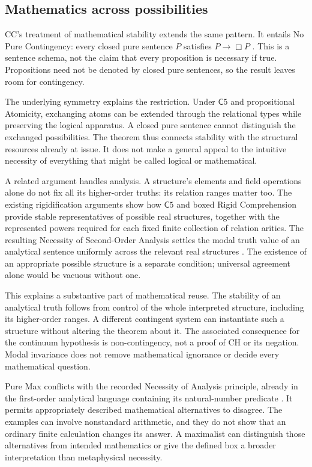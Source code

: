 \documentclass[11pt]{article}
\newcommand{\C}{\mathsf C}
\begin{document}
\subsection{Mathematics across possibilities}

CC's treatment of mathematical stability extends the same pattern. It entails No Pure Contingency: every closed pure sentence $P$ satisfies $P\to\Box P$ \citep{npc}. This is a sentence schema, not the claim that every proposition is necessary if true. Propositions need not be denoted by closed pure sentences, so the result leaves room for contingency.

The underlying symmetry explains the restriction. Under $\C5$ and propositional Atomicity, exchanging atoms can be extended through the relational types while preserving the logical apparatus. A closed pure sentence cannot distinguish the exchanged possibilities. The theorem thus connects stability with the structural resources already at issue. It does not make a general appeal to the intuitive necessity of everything that might be called logical or mathematical.

A related argument handles analysis. A structure's elements and field operations alone do not fix all its higher-order truths: its relation ranges matter too. The existing rigidification arguments show how $\C5$ and boxed Rigid Comprehension provide stable representatives of possible real structures, together with the represented powers required for each fixed finite collection of relation arities. The resulting Necessity of Second-Order Analysis settles the modal truth value of an analytical sentence uniformly across the relevant real structures \citep{analysisconnections}. The existence of an appropriate possible structure is a separate condition; universal agreement alone would be vacuous without one.

This explains a substantive part of mathematical reuse. The stability of an analytical truth follows from control of the whole interpreted structure, including its higher-order ranges. A different contingent system can instantiate such a structure without altering the theorem about it. The associated consequence for the continuum hypothesis is non-contingency, not a proof of CH or its negation. Modal invariance does not remove mathematical ignorance or decide every mathematical question.

Pure Max conflicts with the recorded Necessity of Analysis principle, already in the first-order analytical language containing its natural-number predicate \citep{analysisconnections}. It permits appropriately described mathematical alternatives to disagree. The examples can involve nonstandard arithmetic, and they do not show that an ordinary finite calculation changes its answer. A maximalist can distinguish those alternatives from intended mathematics or give the defined box a broader interpretation than metaphysical necessity.
\end{document}
